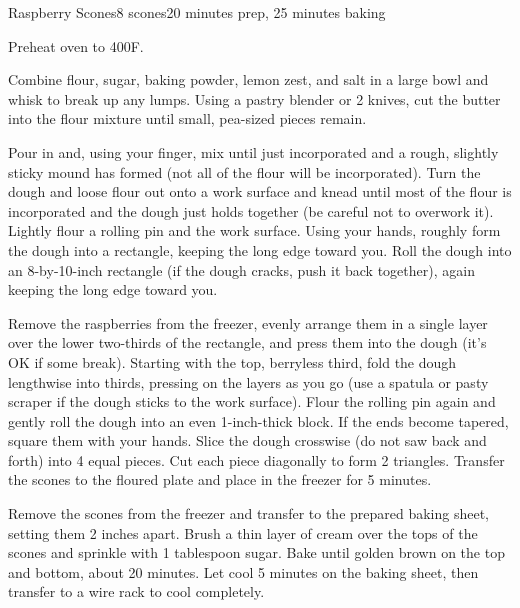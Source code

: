 \documentclass[../Cookbook.tex]{subfiles}
\begin{document}
\begin{recipe}{Raspberry Scones}{8 scones}{20 minutes prep, 25 minutes baking}

	Preheat oven to 400\0F.


Combine flour, sugar, baking powder, lemon zest, and salt in a large bowl and whisk to break up any lumps. Using a pastry blender or 2 knives, cut the butter into the flour mixture until small, pea-sized pieces remain.

Pour in and, using your finger, mix until just incorporated and a rough, slightly sticky mound has formed (not all of the flour will be incorporated). Turn the dough and loose flour out onto a work surface and knead until most of the flour is incorporated and the dough just holds together (be careful not to overwork it). Lightly flour a rolling pin and the work surface. Using your hands, roughly form the dough into a rectangle, keeping the long edge toward you. Roll the dough into an 8-by-10-inch rectangle (if the dough cracks, push it back together), again keeping the long edge toward you.

Remove the raspberries from the freezer, evenly arrange them in a single layer over the lower two-thirds of the rectangle, and press them into the dough (it's OK if some break).
Starting with the top, berryless third, fold the dough lengthwise into thirds, pressing on the layers as you go (use a spatula or pasty scraper if the dough sticks to the work surface).
Flour the rolling pin again and gently roll the dough into an even 1-inch-thick block. If the ends become tapered, square them with your hands. Slice the dough crosswise (do not saw back and forth) into 4 equal pieces. Cut each piece diagonally to form 2 triangles.
Transfer the scones to the floured plate and place in the freezer for 5 minutes.

\newstep
Remove the scones from the freezer and transfer to the prepared baking sheet, setting them 2 inches apart. Brush a thin layer of cream over the tops of the scones and sprinkle with 1 tablespoon sugar. Bake until golden brown on the top and bottom, about 20 minutes. Let cool 5 minutes on the baking sheet, then transfer to a wire rack to cool completely.

\end{recipe}
\end{document}

